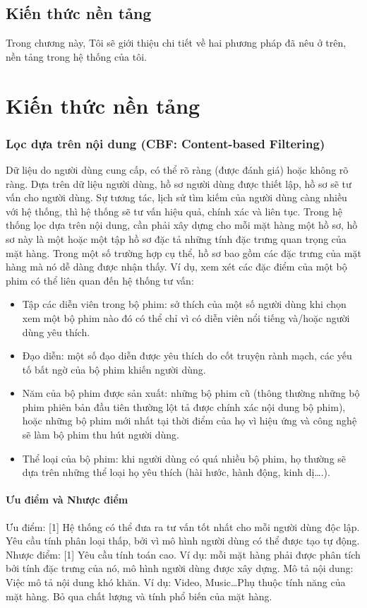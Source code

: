 \documentclass[a4paper,12pt,numbered,print,index,custombib, oneside, custommargin]{report}
\begin{document}
\chapter{Kiến thức nền tảng}
Trong chương này, Tôi sẽ giới thiệu chi tiết về hai phương pháp đã nêu ở trên, nền tảng trong hệ thống của tôi. 
\part{Kiến thức nền tảng}
\section{Lọc dựa trên nội dung (CBF: Content-based Filtering)}
Dữ liệu do người dùng cung cấp, có thể rõ ràng (được đánh giá) hoặc không rõ ràng. Dựa trên dữ liệu người dùng, hồ sơ người dùng được thiết lập, hồ sơ sẽ tư vấn cho người dùng. Sự tương tác, lịch sử tìm kiếm của người dùng càng nhiều với hệ thống, thì hệ thống sẽ tư vấn hiệu quả, chính xác và liên tục. 
Trong hệ thống lọc dựa trên nội dung, cần phải xây dựng cho mỗi mặt hàng một hồ sơ, hồ sơ này là một hoặc một tập hồ sơ đặc tả những tính đặc trưng quan trọng của mặt hàng. Trong một số trường hợp cụ thể, hồ sơ bao gồm các đặc trưng của mặt hàng mà nó dễ dàng được nhận thấy. Ví dụ, xem xét các đặc điểm của một bộ phim có thể liên quan đến hệ thống tư vấn:
\begin{itemize}
\item Tập các diễn viên trong bộ phim: sở thích của một số người dùng khi chọn xem một bộ phim nào đó có thể chỉ vì có diễn viên nổi tiếng và/hoặc người dùng yêu thích.
\item Đạo diễn: một số đạo diễn được yêu thích do cốt truyện rành mạch, các yếu tố bất ngờ của bộ phim khiến người dùng.
\item Năm của bộ phim được sản xuất: những bộ phim cũ (thông thường những bộ phim phiên bản đầu tiên thường lột tả được chính xác nội dung bộ phim), hoặc những bộ phim mới nhất tại thời điểm của họ vì hiệu ứng và công nghệ sẽ làm bộ phim thu hút người dùng.
\item Thể loại của bộ phim: khi người dùng có quá nhiều bộ phim, họ thường sẽ dựa trên những thể loại họ yêu thích (hài hước, hành động, kinh dị….).
\end{itemize}

\subsection{Ưu điểm và Nhược điểm}
Ưu điểm: [1]	Hệ thống có thể đưa ra tư vấn tốt nhất cho mỗi người dùng độc lập. Yêu cầu tính phân loại thấp, bởi vì mô hình người dùng có thể được tạo tự động.
Nhược điểm: [1]   Yêu cầu tính toán cao. Ví dụ: mỗi mặt hàng phải được phân tích bởi tính đặc trưng của nó, mô hình người dùng được xây dựng. Mô tả nội dung: Việc mô tả nội dung khó khăn. Ví dụ: Video, Music…Phụ thuộc tính năng của mặt hàng. Bỏ qua chất lượng và tính phổ biến của mặt hàng.
\end{document}
